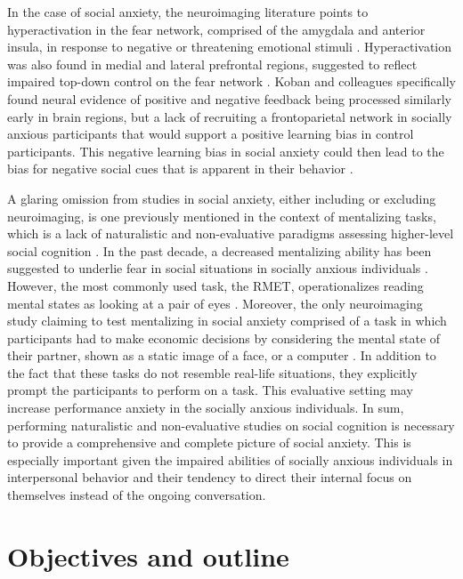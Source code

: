 In the case of social anxiety, the neuroimaging literature points to hyperactivation in the fear network, comprised of the amygdala and anterior insula, in response to negative or threatening emotional stimuli \citep{bruhl2014,etkin2007}. Hyperactivation was also found in medial and lateral prefrontal regions, suggested to reflect impaired top-down control on the fear network \citep{bruhl2014,koban2023}. Koban and colleagues specifically found neural evidence of positive and negative feedback being processed similarly early in brain regions, but a lack of recruiting a frontoparietal network in socially anxious participants that would support a positive learning bias in control participants. This negative learning bias in social anxiety could then lead to the bias for negative social cues that is apparent in their behavior \citep{alvi2020}. 

A glaring omission from studies in social anxiety, either including or excluding neuroimaging, is one previously mentioned in the context of mentalizing tasks, which is a lack of naturalistic and non-evaluative paradigms assessing higher-level social cognition \citep{freitas-ferrari2010}. In the past decade, a decreased mentalizing ability has been suggested to underlie fear in social situations in socially anxious individuals \citep{hezel2014}. However, the most commonly used task, the RMET, operationalizes reading mental states as looking at a pair of eyes \citep[for a review]{baez2023}. Moreover, the only neuroimaging study claiming to test mentalizing in social anxiety comprised of a task in which participants had to make economic decisions by considering the mental state of their partner, shown as a static image of a face, or a computer \citep{sripada2009}. In addition to the fact that these tasks do not resemble real-life situations, they explicitly prompt the participants to perform on a task. This evaluative setting may increase performance anxiety in the socially anxious individuals. In sum, performing naturalistic and non-evaluative studies on social cognition is necessary to provide a comprehensive and complete picture of social anxiety. This is especially important given the impaired abilities of socially anxious individuals in interpersonal behavior and their tendency to direct their internal focus on themselves instead of the ongoing conversation.

\section*{Objectives and outline}

